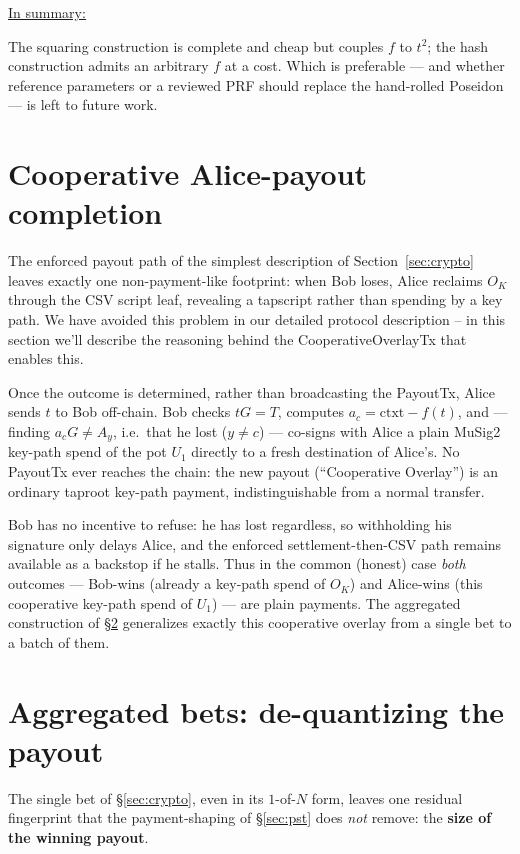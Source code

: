 \documentclass[11pt]{article}
\begin{document}
\underline{In summary:}

The squaring construction is complete and cheap but couples $f$ to $t^2$; the hash construction admits an arbitrary $f$ at a cost. Which is preferable --- and whether reference parameters or a reviewed PRF should replace the hand-rolled Poseidon --- is left to future work.


\section{Cooperative Alice-payout completion}
\label{sec:coop}

The enforced payout path of the simplest description of Section~\ref{sec:crypto} leaves exactly one non-payment-like footprint: when Bob loses, Alice reclaims $O_K$ through the CSV script leaf, revealing a tapscript rather than spending by a key path. We have avoided this problem in our detailed protocol description -- in this section we'll describe the reasoning behind the CooperativeOverlayTx that enables this.

Once the outcome is determined, rather than broadcasting the PayoutTx, Alice sends $t$ to Bob off-chain. Bob checks $tG=T$, computes $a_c=\textrm{ctxt}-f(t)$, and --- finding $a_c G\neq A_y$, i.e.\ that he lost ($y\neq c$) --- co-signs with Alice a plain MuSig2 key-path spend of the pot $U_1$ directly to a fresh destination of Alice's. No PayoutTx ever reaches the chain: the new payout (``Cooperative Overlay'') is an ordinary taproot key-path payment, indistinguishable from a normal transfer.

Bob has no incentive to refuse: he has lost regardless, so withholding his signature only delays Alice, and the enforced settlement-then-CSV path remains available as a backstop if he stalls. Thus in the common (honest) case \emph{both} outcomes --- Bob-wins (already a key-path spend of $O_K$) and Alice-wins (this cooperative key-path spend of $U_1$) --- are plain payments. The aggregated construction of \S\ref{sec:agg} generalizes exactly this cooperative overlay from a single bet to a batch of them.


\section{Aggregated bets: de-quantizing the payout}
\label{sec:agg}

The single bet of \S\ref{sec:crypto}, even in its $1$-of-$N$ form, leaves one residual fingerprint that the payment-shaping of \S\ref{sec:pst} does \emph{not} remove: the \textbf{size of the winning payout}.
\end{document}
